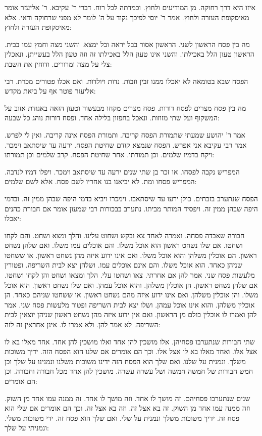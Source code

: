 \documentclass[12pt, openany]{book}
\newcommand{\sethebfont}{
\fontsize{10.5pt}{21.0pt} \selectfont
}
\newcommand{\textblock}[1]{
{\sethebfont #1\\}	
}
\begin{document}
\textblock{איזו היא דרך רחוקה. מן המודיעים ולחוץ. וכמדתה לכל רוח. דברי ר' עקיבא. ר' אליעזר אומר מאיסקופת העזרה ולחוץ. אמר ר' יוסי לפיכך נקוד על ה' לומר לא מפני שרחוקה ודאי. אלא מאיסקופת העזרה ולחוץ: }
\textblock{מה בין פסח הראשון לשני. הראשון אסור בבל יראה ובל ימצא. והשני מצה וחמץ עמו בבית. הראשון טעון הלל באכילתו. והשני אינו טעון הלל באכילתו זה וזה טעון הלל בעשייתן. ונאכלין צלי על מצה ומרורים. ודוחין את השבת: }
\textblock{הפסח שבא בטומאה לא יאכלו ממנו זבין וזבות. נדות ויולדות. ואם אכלו פטורים מכרת. רבי אליעזר פוטר אף על ביאת מקדש: }
\textblock{מה בין פסח מצרים לפסח דורות. פסח מצרים מקחו מבעשור וטעון הזאה באגודת אזוב על המשקוף ועל שתי מזוזות. ונאכל בחפזון בלילה אחד. ופסח דורות נוהג כל שבעה: }
\textblock{אמר ר' יהושע שמעתי שתמורת הפסח קריבה. ותמורת הפסח אינה קריבה. ואין לי לפרש. אמר רבי עקיבא אני אפרש. הפסח שנמצא קודם שחיטת הפסח. ירעה עד שיסתאב וימכר. ויקח בדמיו שלמים. וכן תמורתו. אחר שחיטת הפסח. קרב שלמים וכן תמורתו: }
\textblock{המפריש נקבה לפסחו. או זכר בן שתי שנים ירעה עד שיסתאב וימכר. ויפלו דמיו לנדבה. המפריש פסחו ומת. לא יביאנו בנו אחריו לשם פסח. אלא לשם שלמים: }
\textblock{הפסח שנתערב בזבחים. כולן ירעו עד שיסתאבו. וימכרו ויביא בדמי היפה שבהן ממין זה. ובדמי היפה שבהן ממין זה. ויפסיד המותר מביתו. נתערב בבכורות רבי שמעון אומר אם חבורת כהנים יאכלו: }
\textblock{חבורה שאבדה פסחה. ואמרה לאחד צא ובקש ושחוט עלינו. והלך ומצא ושחט. והם לקחו ושחטו. אם שלו נשחט ראשון הוא אוכל משלו. והם אוכלים עמו משלו. ואם שלהן נשחט ראשון. הם אוכלין משלהן והוא אוכל משלו. ואם אינו ידוע איזה מהן נשחט ראשון. או ששחטו שניהן כאחד. הוא אוכל משלו. והם אינם אוכלים עמו. ושלהן יצא לבית השריפה. ופטורין מלעשות פסח שני. אמר להן אם אחרתי. צאו ושחטו עלי. הלך ומצאו ושחט והן לקחו ושחטו. אם שלהן נשחט ראשון. הן אוכלין משלהן. והוא אוכל עמהן. ואם שלו נשחט ראשון. הוא אוכל משלו. והן אוכלין משלהן. ואם אינו ידוע איזה מהם נשחט ראשון. או ששחטו שניהם כאחד. הן אוכלין משלהן. והוא אינו אוכל עמהן. ושלו יצא לבית השריפה ופטור מלעשות פסח שני. אמר להן ואמרו לו אוכלין כולם מן הראשון. ואם אין ידוע איזה מהן נשחט ראשון שניהן יוצאין לבית השריפה. לא אמר להן. ולא אמרו לו. אינן אחראין זה לזה: }
\textblock{שתי חבורות שנתערבו פסחיהן. אלו מושכין להן אחד ואלו מושכין להן אחד. אחד מאלו בא לו אצל אלו. ואחד מאלו בא לו אצל אלו. וכך הם אומרים אם שלנו הוא הפסח הזה. ידיך משוכות משלך. ונמנית על שלנו. ואם שלך הוא הפסח הזה ידינו משוכות משלנו ונמנינו על שלך וכן חמש חבורות של חמשה חמשה ושל עשרה עשרה. מושכין להן אחד מכל חבורה וחבורה. וכן הם אומרים: }
\textblock{שנים שנתערבו פסחיהם. זה מושך לו אחד. וזה מושך לו אחד. זה ממנה עמו אחד מן השוק. וזה ממנה עמו אחד מן השוק. זה בא אצל זה. וזה בא אצל זה. וכך הם אומרים אם שלי הוא פסח זה. ידיך משוכות משלך ונמנית על שלי. ואם שלך הוא פסח זה. ידי משוכות משלי. ונמניתי על שלך: }
\end{document}
